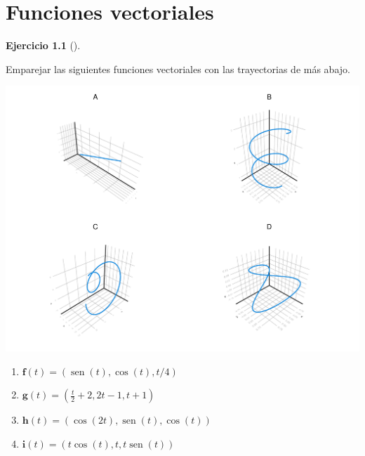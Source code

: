 \documentclass[
  a4paper,
]{scrreport}
\theoremstyle{definition}
\newtheorem{exercise}{Ejercicio}[chapter]
\theoremstyle{remark}
\begin{document}

\hypertarget{funciones-vectoriales}{%
\chapter{Funciones vectoriales}\label{funciones-vectoriales}}

\begin{exercise}[]\protect\hypertarget{exr-trayectorias-funciones-vectoriales}{}\label{exr-trayectorias-funciones-vectoriales}

Emparejar las siguientes funciones vectoriales con las trayectorias de
más abajo.

\includegraphics{img/funciones-vectoriales/trayectorias-espacio.pdf}

\begin{enumerate}
\def\labelenumi{\alph{enumi}.}
\item
  \(\mathbf{f}(t) = (\operatorname{sen}(t), \cos(t), t/4)\)
\item
  \(\mathbf{g}(t) = \left(\frac{t}{2}+2, 2t-1, t+1\right)\)
\item
  \(\mathbf{h}(t) = (\cos(2t), \operatorname{sen}(t), \cos(t))\)
\item
  \(\mathbf{i}(t) = (t\cos(t), t, t\operatorname{sen}(t))\)
\end{enumerate}

\end{exercise}
\end{document}
